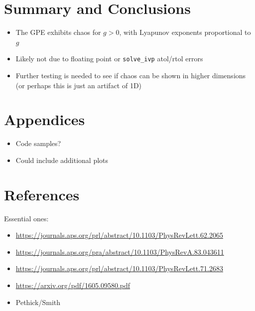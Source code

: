 \documentclass{homework}
\begin{document}
	\section{Summary and Conclusions} 
	\begin{itemize}
		\item The GPE exhibits chaos for $g>0$, with Lyapunov exponents proportional to $g$
		\item Likely not due to floating point or \texttt{solve\_ivp} atol/rtol errors
		\item Further testing is needed to see if chaos can be shown in higher dimensions (or perhaps this is just an artifact of 1D)
	\end{itemize}
	\section*{Appendices}
	\begin{itemize}
		\item Code samples?
		\item Could include additional plots
	\end{itemize}
	
	\section*{References}
	Essential ones:
	\begin{itemize}
		\item \href{https://journals.aps.org/prl/abstract/10.1103/PhysRevLett.62.2065}{https://journals.aps.org/prl/abstract/10.1103/PhysRevLett.62.2065}
		\item \href{https://journals.aps.org/pra/abstract/10.1103/PhysRevA.83.043611}{https://journals.aps.org/pra/abstract/10.1103/PhysRevA.83.043611}
		\item \href{https://journals.aps.org/prl/abstract/10.1103/PhysRevLett.71.2683}{https://journals.aps.org/prl/abstract/10.1103/PhysRevLett.71.2683}
		\item \href{https://arxiv.org/pdf/1605.09580.pdf}{https://arxiv.org/pdf/1605.09580.pdf}
		\item Pethick/Smith
	\end{itemize}
\end{document}
